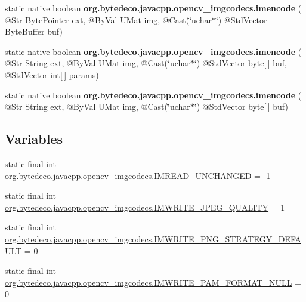 \begin{DoxyCompactItemize}
\item 
\mbox{\label{group__imgcodecs_ga407222b2679059e25f4f2497e9b3096c}} 
static native boolean {\bfseries org.\+bytedeco.\+javacpp.\+opencv\+\_\+imgcodecs.\+imencode} ( @Str Byte\+Pointer ext, @By\+Val U\+Mat img, @Cast(\char`\"{}uchar$\ast$\char`\"{}) @Std\+Vector Byte\+Buffer buf)
\item 
\mbox{\label{group__imgcodecs_gadbd66e63c23880e02fa6625f51c55b10}} 
static native boolean {\bfseries org.\+bytedeco.\+javacpp.\+opencv\+\_\+imgcodecs.\+imencode} ( @Str String ext, @By\+Val U\+Mat img, @Cast(\char`\"{}uchar$\ast$\char`\"{}) @Std\+Vector byte\mbox{[}$\,$\mbox{]} buf, @Std\+Vector int\mbox{[}$\,$\mbox{]} params)
\item 
\mbox{\label{group__imgcodecs_ga9f456f02b6f055f4b34f94e70de35816}} 
static native boolean {\bfseries org.\+bytedeco.\+javacpp.\+opencv\+\_\+imgcodecs.\+imencode} ( @Str String ext, @By\+Val U\+Mat img, @Cast(\char`\"{}uchar$\ast$\char`\"{}) @Std\+Vector byte\mbox{[}$\,$\mbox{]} buf)
\end{DoxyCompactItemize}
\subsection*{Variables}
\begin{DoxyCompactItemize}
\item 
static final int \hyperlink{group__imgcodecs_gaba8d68ffadfa415aec1a51ee480143a7}{org.\+bytedeco.\+javacpp.\+opencv\+\_\+imgcodecs.\+I\+M\+R\+E\+A\+D\+\_\+\+U\+N\+C\+H\+A\+N\+G\+ED} = -\/1
\item 
static final int \hyperlink{group__imgcodecs_gacc5cde2ea5764c3a523832a3d5c6c7e4}{org.\+bytedeco.\+javacpp.\+opencv\+\_\+imgcodecs.\+I\+M\+W\+R\+I\+T\+E\+\_\+\+J\+P\+E\+G\+\_\+\+Q\+U\+A\+L\+I\+TY} = 1
\item 
static final int \hyperlink{group__imgcodecs_gabb28172fadcb5118b62c1e96ce65d7bd}{org.\+bytedeco.\+javacpp.\+opencv\+\_\+imgcodecs.\+I\+M\+W\+R\+I\+T\+E\+\_\+\+P\+N\+G\+\_\+\+S\+T\+R\+A\+T\+E\+G\+Y\+\_\+\+D\+E\+F\+A\+U\+LT} = 0
\item 
static final int \hyperlink{group__imgcodecs_ga90aabdcbe963846b2645af3285b410b8}{org.\+bytedeco.\+javacpp.\+opencv\+\_\+imgcodecs.\+I\+M\+W\+R\+I\+T\+E\+\_\+\+P\+A\+M\+\_\+\+F\+O\+R\+M\+A\+T\+\_\+\+N\+U\+LL} = 0
\end{DoxyCompactItemize}


